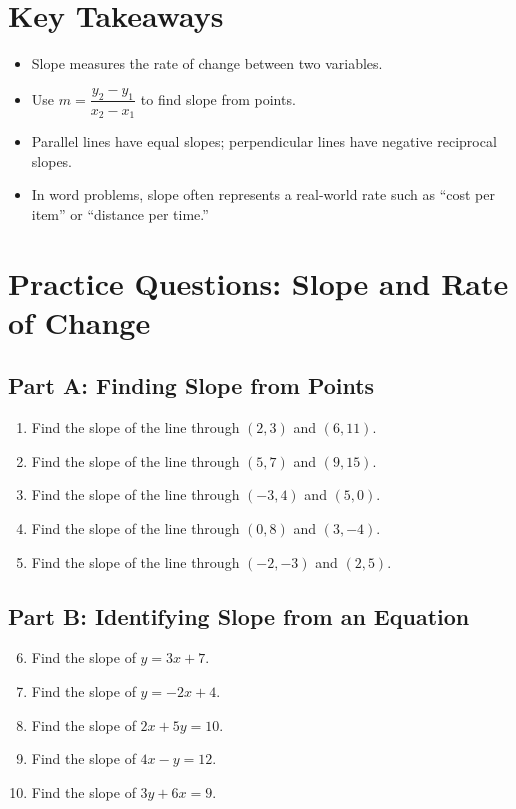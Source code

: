 \documentclass[14pt]{extarticle}
\begin{document}
\section*{Key Takeaways}
\begin{itemize}
    \item Slope measures the rate of change between two variables.
    \item Use \(m = \dfrac{y_2 - y_1}{x_2 - x_1}\) to find slope from points.
    \item Parallel lines have equal slopes; perpendicular lines have negative reciprocal slopes.
    \item In word problems, slope often represents a real-world rate such as “cost per item” or “distance per time.”
\end{itemize}

\newpage


\section*{Practice Questions: Slope and Rate of Change}

\subsection*{Part A: Finding Slope from Points}
\begin{enumerate}
    \item Find the slope of the line through \((2, 3)\) and \((6, 11)\).
    \item Find the slope of the line through \((5, 7)\) and \((9, 15)\).
    \item Find the slope of the line through \((-3, 4)\) and \((5, 0)\).
    \item Find the slope of the line through \((0, 8)\) and \((3, -4)\).
    \item Find the slope of the line through \((-2, -3)\) and \((2, 5)\).
\end{enumerate}

\subsection*{Part B: Identifying Slope from an Equation}
\begin{enumerate}
    \setcounter{enumi}{5}
    \item Find the slope of \(y = 3x + 7\).
    \item Find the slope of \(y = -2x + 4\).
    \item Find the slope of \(2x + 5y = 10\).
    \item Find the slope of \(4x - y = 12\).
    \item Find the slope of \(3y + 6x = 9\).
\end{enumerate}
\end{document}
